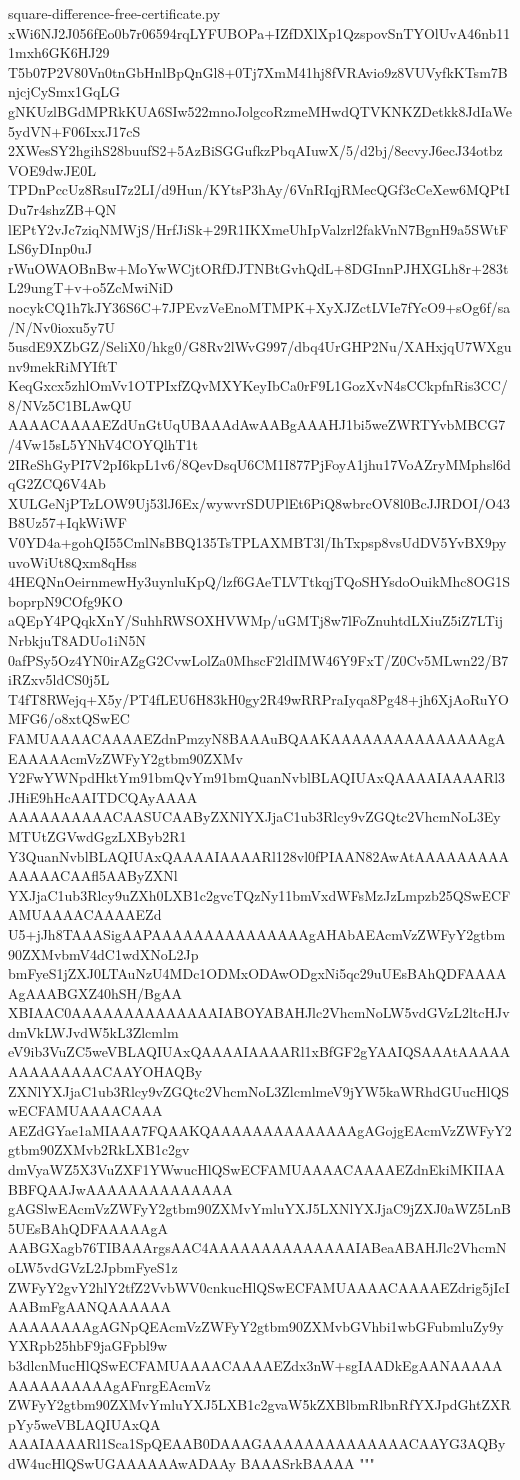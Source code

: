 \documentclass[11pt]{article}
\theoremstyle{definition}
\theoremstyle{remark}
\begin{document}
\begin{filecontents*}[overwrite]{square-difference-free-certificate.py}
xWi6NJ2J056fEo0b7r06594rqLYFUBOPa+IZfDXlXp1QzspovSnTYOlUvA46nb111mxh6GK6HJ29
T5b07P2V80Vn0tnGbHnlBpQnGl8+0Tj7XmM41hj8fVRAvio9z8VUVyfkKTsm7BnjcjCySmx1GqLG
gNKUzlBGdMPRkKUA6SIw522mnoJolgcoRzmeMHwdQTVKNKZDetkk8JdIaWe5ydVN+F06IxxJ17cS
2XWesSY2hgihS28buufS2+5AzBiSGGufkzPbqAIuwX/5/d2bj/8ecvyJ6ecJ34otbzVOE9dwJE0L
TPDnPccUz8RsuI7z2LI/d9Hun/KYtsP3hAy/6VnRIqjRMecQGf3cCeXew6MQPtIDu7r4shzZB+QN
lEPtY2vJc7ziqNMWjS/HrfJiSk+29R1IKXmeUhIpValzrl2fakVnN7BgnH9a5SWtFLS6yDInp0uJ
rWuOWAOBnBw+MoYwWCjtORfDJTNBtGvhQdL+8DGInnPJHXGLh8r+283tL29ungT+v+o5ZcMwiNiD
nocykCQ1h7kJY36S6C+7JPEvzVeEnoMTMPK+XyXJZctLVIe7fYcO9+sOg6f/sa/N/Nv0ioxu5y7U
5usdE9XZbGZ/SeliX0/hkg0/G8Rv2lWvG997/dbq4UrGHP2Nu/XAHxjqU7WXgunv9mekRiMYIftT
KeqGxcx5zhlOmVv1OTPIxfZQvMXYKeyIbCa0rF9L1GozXvN4sCCkpfnRis3CC/8/NVz5C1BLAwQU
AAAACAAAAEZdUnGtUqUBAAAdAwAABgAAAHJ1bi5weZWRTYvbMBCG7/4Vw15sL5YNhV4COYQlhT1t
2IReShGyPI7V2pI6kpL1v6/8QevDsqU6CM1I877PjFoyA1jhu17VoAZryMMphsl6dqG2ZCQ6V4Ab
XULGeNjPTzLOW9Uj53lJ6Ex/wywvrSDUPlEt6PiQ8wbrcOV8l0BcJJRDOI/O43B8Uz57+IqkWiWF
V0YD4a+gohQI55CmlNsBBQ135TsTPLAXMBT3l/IhTxpsp8vsUdDV5YvBX9pyuvoWiUt8Qxm8qHss
4HEQNnOeirnmewHy3uynluKpQ/lzf6GAeTLVTtkqjTQoSHYsdoOuikMhc8OG1SboprpN9COfg9KO
aQEpY4PQqkXnY/SuhhRWSOXHVWMp/uGMTj8w7lFoZnuhtdLXiuZ5iZ7LTijNrbkjuT8ADUo1iN5N
0afPSy5Oz4YN0irAZgG2CvwLolZa0MhscF2ldIMW46Y9FxT/Z0Cv5MLwn22/B7iRZxv5ldCS0j5L
T4fT8RWejq+X5y/PT4fLEU6H83kH0gy2R49wRRPraIyqa8Pg48+jh6XjAoRuYOMFG6/o8xtQSwEC
FAMUAAAACAAAAEZdnPmzyN8BAAAuBQAAKAAAAAAAAAAAAAAAgAEAAAAAcmVzZWFyY2gtbm90ZXMv
Y2FwYWNpdHktYm91bmQvYm91bmQuanNvblBLAQIUAxQAAAAIAAAARl3JHiE9hHcAAITDCQAyAAAA
AAAAAAAAAACAASUCAAByZXNlYXJjaC1ub3Rlcy9vZGQtc2VhcmNoL3EyMTUtZGVwdGgzLXByb2R1
Y3QuanNvblBLAQIUAxQAAAAIAAAARl128vl0fPIAAN82AwAtAAAAAAAAAAAAAACAAfl5AAByZXNl
YXJjaC1ub3Rlcy9uZXh0LXB1c2gvcTQzNy11bmVxdWFsMzJzLmpzb25QSwECFAMUAAAACAAAAEZd
U5+jJh8TAAASigAAPAAAAAAAAAAAAAAAgAHAbAEAcmVzZWFyY2gtbm90ZXMvbmV4dC1wdXNoL2Jp
bmFyeS1jZXJ0LTAuNzU4MDc1ODMxODAwODgxNi5qc29uUEsBAhQDFAAAAAgAAABGXZ40hSH/BgAA
XBIAAC0AAAAAAAAAAAAAAIABOYABAHJlc2VhcmNoLW5vdGVzL2ltcHJvdmVkLWJvdW5kL3Zlcmlm
eV9ib3VuZC5weVBLAQIUAxQAAAAIAAAARl1xBfGF2gYAAIQSAAAtAAAAAAAAAAAAAACAAYOHAQBy
ZXNlYXJjaC1ub3Rlcy9vZGQtc2VhcmNoL3ZlcmlmeV9jYW5kaWRhdGUucHlQSwECFAMUAAAACAAA
AEZdGYae1aMIAAA7FQAAKQAAAAAAAAAAAAAAgAGojgEAcmVzZWFyY2gtbm90ZXMvb2RkLXB1c2gv
dmVyaWZ5X3VuZXF1YWwucHlQSwECFAMUAAAACAAAAEZdnEkiMKIIAABBFQAAJwAAAAAAAAAAAAAA
gAGSlwEAcmVzZWFyY2gtbm90ZXMvYmluYXJ5LXNlYXJjaC9jZXJ0aWZ5LnB5UEsBAhQDFAAAAAgA
AABGXagb76TIBAAArgsAAC4AAAAAAAAAAAAAAIABeaABAHJlc2VhcmNoLW5vdGVzL2JpbmFyeS1z
ZWFyY2gvY2hlY2tfZ2VvbWV0cnkucHlQSwECFAMUAAAACAAAAEZdrig5jIcIAABmFgAANQAAAAAA
AAAAAAAAgAGNpQEAcmVzZWFyY2gtbm90ZXMvbGVhbi1wbGFubmluZy9yYXRpb25hbF9jaGFpbl9w
b3dlcnMucHlQSwECFAMUAAAACAAAAEZdx3nW+sgIAADkEgAANAAAAAAAAAAAAAAAgAFnrgEAcmVz
ZWFyY2gtbm90ZXMvYmluYXJ5LXB1c2gvaW5kZXBlbmRlbnRfYXJpdGhtZXRpYy5weVBLAQIUAxQA
AAAIAAAARl1Sca1SpQEAAB0DAAAGAAAAAAAAAAAAAACAAYG3AQBydW4ucHlQSwUGAAAAAAwADAAy
BAAASrkBAAAA
"""


\end{filecontents*}
\end{document}
